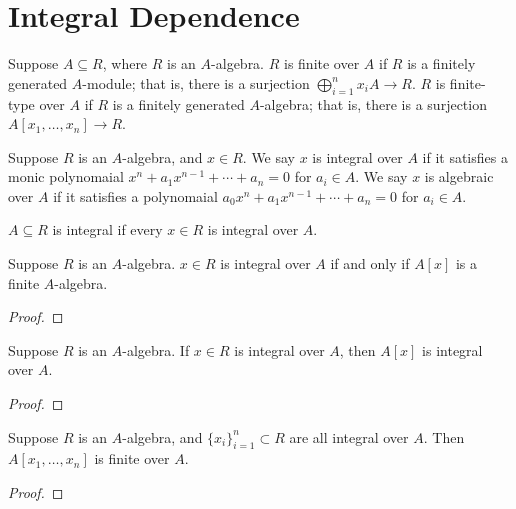 \section{Integral Dependence}

\begin{definition}
    Suppose \(A \subseteq R\), where \(R\) is an \(A\)-algebra.
    \(R\) is finite over \(A\) if \(R\) is a finitely generated \(A\)-module;
    that is, there is a surjection \(\bigoplus_{i=1}^n x_i A \to R\).
    \(R\) is finite-type over \(A\) if \(R\) is a finitely generated \(A\)-algebra;
    that is, there is a surjection \(A[x_1,\hdots,x_n] \to R\).
\end{definition}
\begin{definition}
    Suppose \(R\) is an \(A\)-algebra, and \(x \in R\).
    We say \(x\) is integral over \(A\) if it satisfies a monic polynomaial
    \(x^n + a_1 x^{n-1} + \cdots + a_n = 0\) for \(a_i \in A\).
    We say \(x\) is algebraic over \(A\) if it satisfies a polynomaial
    \(a_0 x^n + a_1 x^{n-1} + \cdots + a_n = 0\) for \(a_i \in A\).
\end{definition}
\begin{definition}
    \(A \subseteq R\) is integral if every \(x \in R\) is integral over \(A\).
\end{definition}
\begin{lemma}
    Suppose \(R\) is an \(A\)-algebra.
    \(x \in R\) is integral over \(A\) if and only if \(A[x]\) is a finite \(A\)-algebra.
\end{lemma}
\begin{proof}
    
\end{proof}
\begin{corollary}
    Suppose \(R\) is an \(A\)-algebra.
    If \(x \in R\) is integral over \(A\),
    then \(A[x]\) is integral over \(A\).
\end{corollary}
\begin{proof}
    
\end{proof}
\begin{corollary}
    Suppose \(R\) is an \(A\)-algebra,
    and \({\{x_i\}}_{i=1}^n \subset R\) are all integral over \(A\).
    Then \(A[x_1,\hdots,x_n]\) is finite over \(A\).
\end{corollary}
\begin{proof}
    
\end{proof}

